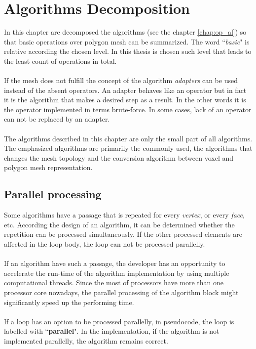 \chapter{Algorithms Decomposition}
\label{chap:alg_decomp}

In this chapter are decomposed the algorithms (see the chapter \ref{chap:op_al}) so that basic
operations over polygon
mesh can be summarized. The word ``\emph{basic}" is relative according the chosen level.
In this thesis is chosen such level that leads to the least count of operations in total.\\
\\
If the mesh does not fulfill the concept of the algorithm \emph{adapters} can be used instead
of the absent operators. An adapter behaves like an operator but in fact it is the algorithm that
makes a desired step as a result. In the other words it is the operator implemented in terms
brute-force. In some cases, lack of an operator can not be replaced by an adapter.\\
\\
The algorithms described in this chapter are only the small part of all algorithms. The emphasized
algorithms are primarily the commonly used, the algorithms that changes the mesh topology and
the conversion algorithm between voxel and polygon mesh representation.

\section{Parallel processing}

Some algorithms have a passage that is repeated for every \emph{vertex}, or every \emph{face}, etc.
According the design of an algorithm, it can be determined whether the repetition can be processed
simultaneously. If the other processed elements are affected in the loop body, the loop can not
be processed parallelly.\\
\\
If an algorithm have such a passage, the developer has an opportunity to accelerate the run-time 
of the algorithm implementation by using multiple computational threads. Since the most of processors
have more than one processor core nowadays, the parallel processing of the algorithm block might
significantly speed up the performing time.\\
\\
If a loop has an option to be processed parallelly,
in pseudocode, the loop is labelled with ``\textbf{parallel}".
In the implementation, if the algorithm is not implemented parallelly, the algorithm remains correct.

